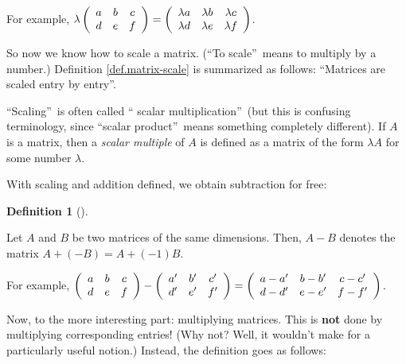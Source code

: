 \documentclass[numbers=enddot,12pt,final,onecolumn,notitlepage]{scrartcl}%
\theoremstyle{definition}
\newtheorem{defi}[theo]{Definition}
\newenvironment{definition}[1][]
{\begin{defi}[#1]\begin{leftbar}}
{\end{leftbar}\end{defi}}
\begin{document}
For example, $\lambda\left(
\begin{array}
[c]{ccc}%
a & b & c\\
d & e & f
\end{array}
\right)  =\left(
\begin{array}
[c]{ccc}%
\lambda a & \lambda b & \lambda c\\
\lambda d & \lambda e & \lambda f
\end{array}
\right)  $.

So now we know how to scale a matrix. (\textquotedblleft To
scale\textquotedblright\ means to multiply by a number.) Definition
\ref{def.matrix-scale} is summarized as follows: \textquotedblleft Matrices
are scaled entry by entry\textquotedblright.

\textquotedblleft Scaling\textquotedblright\ is often called \textquotedblleft
scalar multiplication\textquotedblright\ (but this is confusing terminology,
since \textquotedblleft scalar product\textquotedblright\ means something
completely different). If $A$ is a matrix, then a \textit{scalar multiple} of
$A$ is defined as a matrix of the form $\lambda A$ for some number $\lambda$.

With scaling and addition defined, we obtain subtraction for free:

\begin{definition}
\label{def.matrix-diff}Let $A$ and $B$ be two matrices of the same dimensions.
Then, $A-B$ denotes the matrix $A+\left(  -B\right)  =A+\left(  -1\right)  B$.
\end{definition}

For example, $\left(
\begin{array}
[c]{ccc}%
a & b & c\\
d & e & f
\end{array}
\right)  -\left(
\begin{array}
[c]{ccc}%
a^{\prime} & b^{\prime} & c^{\prime}\\
d^{\prime} & e^{\prime} & f^{\prime}%
\end{array}
\right)  =\left(
\begin{array}
[c]{ccc}%
a-a^{\prime} & b-b^{\prime} & c-c^{\prime}\\
d-d^{\prime} & e-e^{\prime} & f-f^{\prime}%
\end{array}
\right)  $.

Now, to the more interesting part: multiplying matrices. This is \textbf{not}
done by multiplying corresponding entries! (Why not? Well, it wouldn't make
for a particularly useful notion.) Instead, the definition goes as follows:
\end{document}
